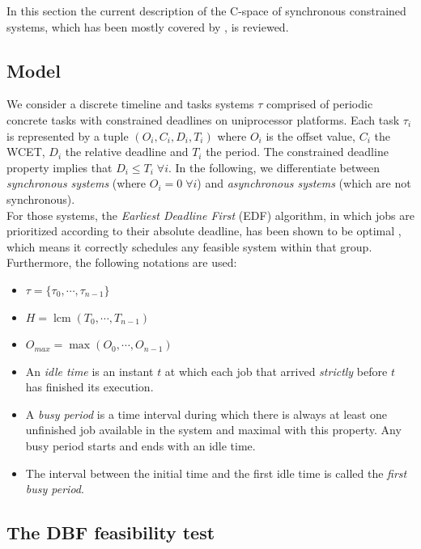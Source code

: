 \documentclass[times, 10pt,twocolumn, a4paper]{article}
\begin{document}
	In this section the current description of the C-space of synchronous
	constrained systems, which has been mostly covered by \cite{george2009characterization}, is reviewed.

	\subsection{Model}

		We consider a discrete timeline and tasks systems $\tau$ comprised of periodic concrete
		tasks with constrained deadlines on uniprocessor platforms. Each task
		$\tau_i$ is represented by a tuple $(O_i, C_i, D_i, T_i)$ where $O_i$ is the offset value,
		$C_i$ the WCET, $D_i$ the relative deadline and $T_i$ the period.
		The constrained deadline property implies that $D_i \leq T_i \; \forall i$. In
		the following, we differentiate between \emph{synchronous systems} (where $O_i
		= 0 \; \forall i$) and \emph{asynchronous systems} (which are not synchronous).\\

		For those systems, the \emph{Earliest Deadline First} (EDF) algorithm, in
		which jobs are prioritized according to their absolute deadline, has been
		shown to be optimal \cite{liu1973scheduling}, which means it
		correctly schedules any feasible system within that group.\\

		Furthermore, the following notations are used:
		\begin{itemize}
			\item $\tau = \{\tau_0, \cdots, \tau_{n-1}\}$
			\item $H = \operatorname{lcm}(T_0, \cdots, T_{n-1})$
			\item $O_{max} = \max (O_0, \cdots, O_{n-1})$
			\item An \emph{idle time} is an instant $t$ at which each job that arrived
			\emph{strictly} before $t$ has finished its execution.
			\item A \emph{busy period} is a time interval during which there is always
			at least one unfinished job available in the system and maximal
			with this property. Any busy period starts and ends
			with an idle time.
			\item The interval between the initial time and the first
			idle time is called the \emph{first busy period}.
		\end{itemize}

	\subsection{The DBF feasibility test}
\end{document}
